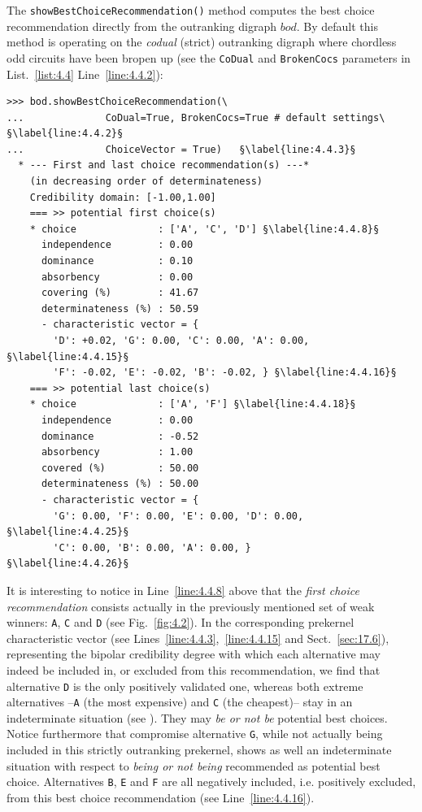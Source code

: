 The \texttt{showBestChoiceRecommendation()} method computes the \Rubis best choice recommendation directly from the outranking digraph $bod$. By default this method is operating on the \emph{codual} (strict) outranking digraph where chordless odd circuits have been bropen up (see the \texttt{CoDual} and \texttt{BrokenCocs} parameters in List.~\vref{list:4.4} Line~\ref{line:4.4.2}):
\begin{lstlisting}[caption={Computing the best choice recommendation},label=list:4.4]
>>> bod.showBestChoiceRecommendation(\
...              CoDual=True, BrokenCocs=True # default settings\ §\label{line:4.4.2}§
...              ChoiceVector = True)   §\label{line:4.4.3}§
  * --- First and last choice recommendation(s) ---*
    (in decreasing order of determinateness)   
    Credibility domain: [-1.00,1.00]
    === >> potential first choice(s)
    * choice              : ['A', 'C', 'D'] §\label{line:4.4.8}§
      independence        : 0.00
      dominance           : 0.10
      absorbency          : 0.00
      covering (%)        : 41.67
      determinateness (%) : 50.59
      - characteristic vector = {
        'D': +0.02, 'G': 0.00, 'C': 0.00, 'A': 0.00, §\label{line:4.4.15}§
        'F': -0.02, 'E': -0.02, 'B': -0.02, } §\label{line:4.4.16}§
    === >> potential last choice(s) 
    * choice              : ['A', 'F'] §\label{line:4.4.18}§
      independence        : 0.00
      dominance           : -0.52
      absorbency          : 1.00
      covered (%)         : 50.00
      determinateness (%) : 50.00
      - characteristic vector = {
        'G': 0.00, 'F': 0.00, 'E': 0.00, 'D': 0.00, §\label{line:4.4.25}§
        'C': 0.00, 'B': 0.00, 'A': 0.00, }          §\label{line:4.4.26}§
\end{lstlisting}				  

It is interesting to notice in Line~\ref{line:4.4.8} above that the \Rubis \emph{first choice recommendation} consists actually in the previously mentioned set of weak \Condorcet winners: \texttt{A}, \texttt{C} and \texttt{D} (see Fig.~\vref{fig:4.2}). In the corresponding prekernel characteristic vector (see Lines~\ref{line:4.4.3},~\ref{line:4.4.15} and Sect.~\ref{sec:17.6}), representing the bipolar credibility degree with which each alternative may indeed be included in, or excluded from this recommendation, we find that alternative \texttt{D} is the only positively validated one, whereas both extreme alternatives --\texttt{A} (the most expensive) and \texttt{C} (the cheapest)-- stay in an indeterminate situation (see \citealp{BIS-2006a,BIS-2006b}). They may \emph{be or not be} potential best choices. Notice furthermore that compromise alternative \texttt{G}, while not actually being included in this strictly outranking prekernel, shows as well an indeterminate situation with respect to \emph{being or not being} recommended as potential best choice. Alternatives \texttt{B}, \texttt{E} and \texttt{F} are all negatively included, i.e. positively excluded, from this best choice recommendation (see Line~\ref{line:4.4.16}).

